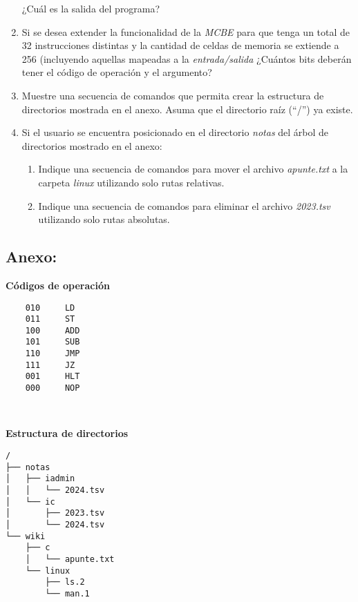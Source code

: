 \documentclass[12pt]{article}
\begin{document}
\begin{enumerate}
        ¿Cuál es la salida del programa?

    \item Si se desea extender la funcionalidad de la \emph{MCBE} para que
        tenga un total de 32 instrucciones distintas y la cantidad de celdas
        de memoria se extiende a 256 (incluyendo aquellas mapeadas a la
        \emph{entrada/salida} ¿Cuántos bits deberán tener el código de
        operación y el argumento?

    \item Muestre una secuencia de comandos que permita crear la estructura de
        directorios mostrada en el anexo. Asuma que el directorio raíz (``/'')
        ya existe.

    \item Si el usuario se encuentra posicionado en el directorio
        \emph{notas} del árbol de directorios mostrado en el anexo:

        \begin{enumerate}

            \item Indique una secuencia de comandos para mover el archivo
                \emph{apunte.txt} a la carpeta \emph{linux} utilizando solo
                rutas relativas.

            \item Indique una secuencia de comandos para eliminar el archivo
                \emph{2023.tsv} utilizando solo rutas absolutas.

        \end{enumerate}

\end{enumerate}

\subsection*{ \large\textbf{Anexo:} }

\begin{minipage}{0.45\textwidth}
\textbf{Códigos de operación}

\begin{verbatim}
    010     LD
    011     ST
    100     ADD
    101     SUB
    110     JMP
    111     JZ
    001     HLT
    000     NOP
\end{verbatim}
\end{minipage}
~
\begin{minipage}{0.45\textwidth}
\textbf{Estructura de directorios}

\begin{verbatim}
/
├── notas
│   ├── iadmin
│   │   └── 2024.tsv
│   └── ic
│       ├── 2023.tsv
│       └── 2024.tsv
└── wiki
    ├── c
    │   └── apunte.txt
    └── linux
        ├── ls.2
        └── man.1
\end{verbatim}

\end{minipage}
\end{document}
